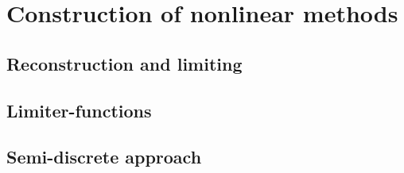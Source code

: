 \section{Construction of nonlinear methods}


\subsection{Reconstruction and limiting}


\subsection{Limiter-functions}


\subsection{Semi-discrete approach}